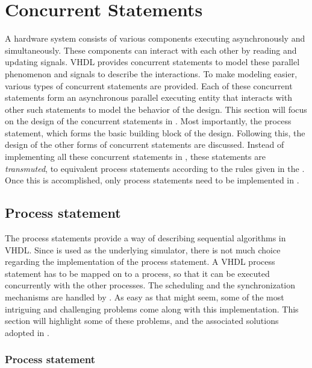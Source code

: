 \documentclass[11pt]{article}
\begin{document}


\section{Concurrent Statements}
\label{chp:design_concurrent}

A hardware system consists of various components executing
asynchronously and simultaneously.  These components can interact with
each other by reading and updating signals.  VHDL provides concurrent
statements to model these parallel phenomenon and signals to describe
the interactions.  To make modeling easier, various types of
concurrent statements are provided.  Each of these concurrent
statements form an asynchronous parallel executing entity that
interacts with other such statements to model the behavior of the
design.  This section will focus on the design of the concurrent
statements in \tyvis.  Most importantly, the process statement, which
forms the basic building block of the design.  Following this, the
design of the other forms of concurrent statements are discussed.
Instead of implementing all these concurrent statements in
\tyvis, these statements are \textit{transmuted}, to equivalent process
statements according to the rules given in the \LRM.  Once this is
accomplished, only process statements need to be implemented in \tyvis.

\subsection{Process statement}

The process statements provide a way of describing sequential
algorithms in VHDL.  Since \warped\/ is used as the underlying
simulator, there is not much choice regarding the implementation of
the process statement.  A VHDL process statement has to be mapped on
to a \warped\/ process, so that it can be executed concurrently with
the other processes.  The scheduling and the synchronization
mechanisms are handled by \warped.  As easy as that might seem, some
of the most intriguing and challenging problems come along with this
implementation.  This section will highlight some of these problems,
and the associated solutions adopted in \tyvis.

\subsubsection{Process statement}
\end{document}

